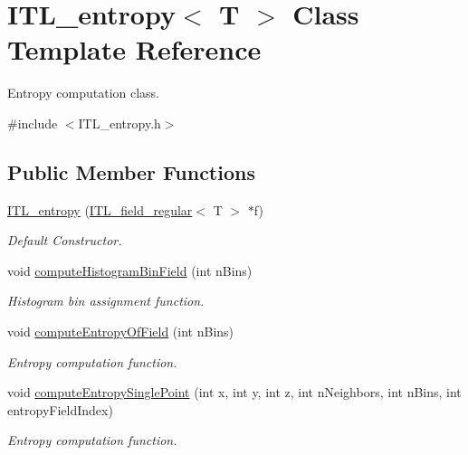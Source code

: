 \hypertarget{classITL__entropy}{
\section{ITL\_\-entropy$<$ T $>$ Class Template Reference}
\label{classITL__entropy}
}


Entropy computation class.  




{\ttfamily \#include $<$ITL\_\-entropy.h$>$}

\subsection*{Public Member Functions}
\begin{DoxyCompactItemize}
\item 
\hyperlink{classITL__entropy_a1f446a47b389fe894139cefd9843c0dc}{ITL\_\-entropy} (\hyperlink{classITL__field__regular}{ITL\_\-field\_\-regular}$<$ T $>$ $\ast$f)
\begin{DoxyCompactList}\small\item\em Default Constructor. \item\end{DoxyCompactList}\item 
void \hyperlink{classITL__entropy_a39aa28b0d3d0964bee919d23fe3768d7}{computeHistogramBinField} (int nBins)
\begin{DoxyCompactList}\small\item\em Histogram bin assignment function. \item\end{DoxyCompactList}\item 
void \hyperlink{classITL__entropy_a4ad3dd3d26770b6e651d936e2914ed2f}{computeEntropyOfField} (int nBins)
\begin{DoxyCompactList}\small\item\em Entropy computation function. \item\end{DoxyCompactList}\item 
void \hyperlink{classITL__entropy_aedf49a83fa884a6a4c191a0ddba518dd}{computeEntropySinglePoint} (int x, int y, int z, int nNeighbors, int nBins, int entropyFieldIndex)
\begin{DoxyCompactList}\small\item\em Entropy computation function. \item\end{DoxyCompactList}\item 

\end{DoxyCompactItemize}
